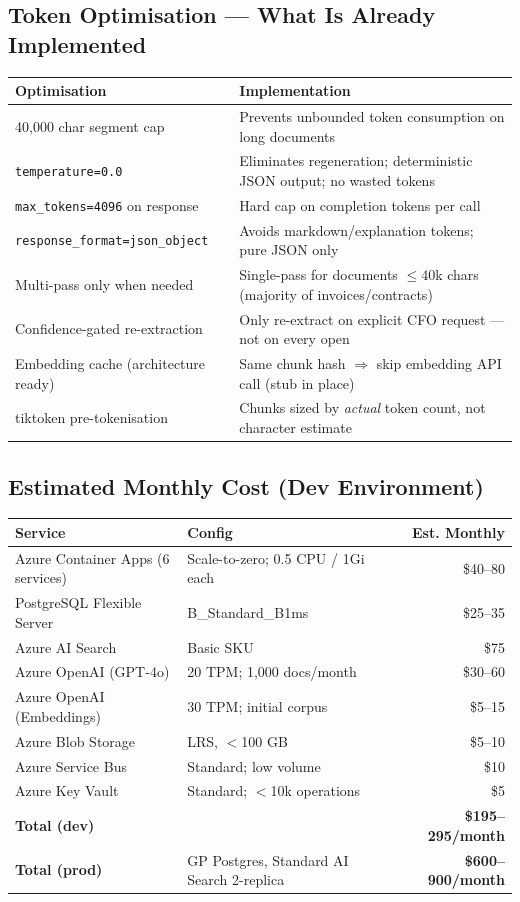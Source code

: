 \documentclass[12pt,a4paper]{article}
\newcommand{\codeinline}[1]{\texttt{\small\color{NordicBlue}#1}}
\begin{document}
\subsection{Token Optimisation — What Is Already Implemented}

\begin{tabularx}{\textwidth}{lX}
\toprule
\textbf{Optimisation} & \textbf{Implementation} \\
\midrule
40,000 char segment cap & Prevents unbounded token consumption on long documents \\
\codeinline{temperature=0.0} & Eliminates regeneration; deterministic JSON output; no wasted tokens \\
\codeinline{max\_tokens=4096} on response & Hard cap on completion tokens per call \\
\codeinline{response\_format=json\_object} & Avoids markdown/explanation tokens; pure JSON only \\
Multi-pass only when needed & Single-pass for documents $\leq$40k chars (majority of invoices/contracts) \\
Confidence-gated re-extraction & Only re-extract on explicit CFO request — not on every open \\
Embedding cache (architecture ready) & Same chunk hash $\Rightarrow$ skip embedding API call (stub in place) \\
tiktoken pre-tokenisation & Chunks sized by \emph{actual} token count, not character estimate \\
\bottomrule
\end{tabularx}

\subsection{Estimated Monthly Cost (Dev Environment)}

\begin{tabularx}{\textwidth}{lXr}
\toprule
\textbf{Service} & \textbf{Config} & \textbf{Est. Monthly} \\
\midrule
Azure Container Apps (6 services) & Scale-to-zero; 0.5 CPU / 1Gi each & \$40–80 \\
PostgreSQL Flexible Server & B\_Standard\_B1ms & \$25–35 \\
Azure AI Search & Basic SKU & \$75 \\
Azure OpenAI (GPT-4o) & 20 TPM; 1,000 docs/month & \$30–60 \\
Azure OpenAI (Embeddings) & 30 TPM; initial corpus & \$5–15 \\
Azure Blob Storage & LRS, $<$100 GB & \$5–10 \\
Azure Service Bus & Standard; low volume & \$10 \\
Azure Key Vault & Standard; $<$10k operations & \$5 \\
\midrule
\textbf{Total (dev)} & & \textbf{\$195–295/month} \\
\midrule
\textbf{Total (prod)} & GP Postgres, Standard AI Search 2-replica & \textbf{\$600–900/month} \\
\bottomrule
\end{tabularx}
\end{document}
